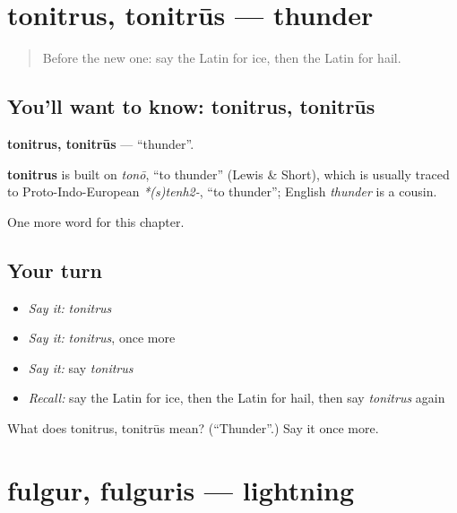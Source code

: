 \section[tonitrus, tonitrūs]{tonitrus, tonitrūs — thunder}

\label{lesson:LA-C130-tonitrus}



\begin{quote}
Before the new one: say the Latin for ice, then the Latin for hail.
\end{quote}

\subsection*{You'll want to know: tonitrus, tonitrūs}
\textbf{tonitrus, tonitrūs} — \textquotedblleft{}thunder\textquotedblright{}.

\begin{cousinweb}
\textbf{tonitrus} is built on \emph{tonō}, \textquotedblleft{}to thunder\textquotedblright{} (Lewis \& Short), which is usually traced to Proto-Indo-European \emph{*(s)tenh2-}, \textquotedblleft{}to thunder\textquotedblright{}; English \emph{thunder} is a cousin.
\end{cousinweb}

\begin{grammarlens}[title={What you've built}]
One more word for this chapter.
\end{grammarlens}

\subsection*{Your turn}
\begin{itemize}
\raggedright
  \item \emph{Say it:} \emph{tonitrus}
  \item \emph{Say it:} \emph{tonitrus}, once more
  \item \emph{Say it:} say \emph{tonitrus}
  \item \emph{Recall:} say the Latin for ice, then the Latin for hail, then say \emph{tonitrus} again
\end{itemize}

\begin{tcolorbox}[breakable,colback=teal!4,colframe=teal!35!black,title={Before you move on}]
What does tonitrus, tonitrūs mean? (\textquotedblleft{}Thunder\textquotedblright{}.) Say it once more.
\end{tcolorbox}
\section[fulgur, fulguris]{fulgur, fulguris — lightning}

